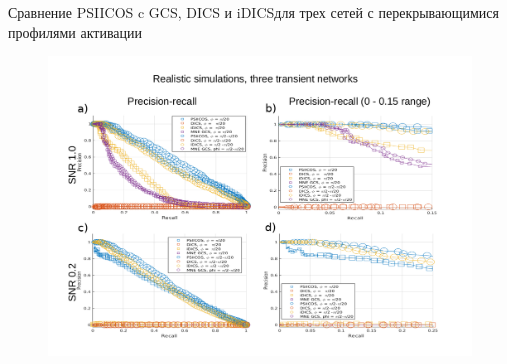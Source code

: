 \documentclass[12pt]{beamer}
\begin{document}
\begin{frame}
{Сравнение PSIICOS c GCS, DICS и iDICS}{для трех сетей с перекрывающимися профилями активации}
\begin{figure}[!ht]
 \includegraphics[width=\textwidth]{../images/psiicos_paper/Figure7_hr.jpg}
\end{figure}%
\end{frame}
\end{document}
